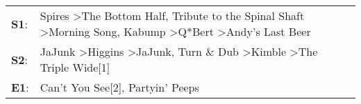 \begin{supertabular}{p{0.03\textwidth}p{0.92\textwidth}}
 \textbf{S1}:  &  Spires\textsuperscript{} \textgreater \enspace The Bottom Half\textsuperscript{}, \enspace Tribute to the Spinal Shaft\textsuperscript{} \textgreater \enspace Morning Song\textsuperscript{}, \enspace Kabump\textsuperscript{} \textgreater \enspace Q*Bert\textsuperscript{} \textgreater \enspace Andy's Last Beer\textsuperscript{}  \enspace  \\
 \textbf{S2}:  &                                                                 JaJunk\textsuperscript{} \textgreater \enspace Higgins\textsuperscript{} \textgreater \enspace JaJunk\textsuperscript{}, \enspace Turn \& Dub\textsuperscript{} \textgreater \enspace Kimble\textsuperscript{} \textgreater \enspace The Triple Wide[1]\textsuperscript{}  \enspace  \\
 \textbf{E1}:  &                                                                                                                                                                                                                                                             Can't You See[2]\textsuperscript{}, \enspace Partyin' Peeps\textsuperscript{}  \enspace  \\
\end{supertabular}

